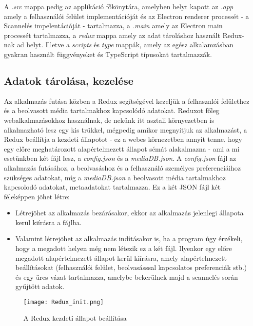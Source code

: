 A {\it .src} mappa pedig az applikáció főkönytára, amelyben helyt kapott az {\it .app} amely a felhasználói felület implementációját és az Electron renderer processét - a Scannelés impelentációját -  tartalmazza, a {\it .main} amely az Electron main processét tartalmazza, a {\it redux} mappa amely az adat tároláshoz használt Redux-nak ad helyt. Illetve a {\it scripts} és {\it type} mappák, amely az egész alkalamzásban gyakran használt függvényeket és TypeScript típusokat tartalmazzák.

\subsection{Adatok tárolása, kezelése}
Az alkalmazás futása közben a Redux segítségével kezeljük a felhasznlói felülethez és a beolvasott média tartalmakhoz kapcsolódó adatokat. Reduxot főleg webalkalmazásokhoz használnak, de nekünk itt asztali környezetben is alkalmazható lesz egy kis trükkel, mégpedig amikor megnyitjuk az alkalmazást, a Redux beállítja a kezdeti állapotot - ez a webes körnezetben annyit tenne, hogy egy előre meghatározott alapértelmezett állapot sémát alakalmazna - ami a mi esetünkben két fájl lesz, a {\it config.json} és a {\it mediaDB.json}. A {\it config.json} fájl az alkalmazás futásához, a beolvasáshoz és a felhasználó személyes preferenciáihoz szükséges adatokat, míg a {\it mediaDB.json} a beolvasott média tartalmakhoz kapcsolodó adatokat, metaadatokat tartalmazza. Ez a két JSON fájl két féleképpen jöhet létre:
\begin{itemize}
    \item Létrejöhet az alkalmazás bezárásakor, ekkor az alkalmazás jelenlegi állapota kerül kiírásra a fájlba.
    \item Valamint létrejöhet az alkalmazás indításakor is, ha a program úgy érzékeli, hogy a megadott helyen még nem létezik ez a két fájl. Ilyenkor egy előre megadott alapértelmezett állapot kerül kiírásra, amely alapértelmezett beállításokat (felhasználói felület, beolvasásssal kapcsolatos preferenciák stb.) és egy üres vázat tartalmazza, amelybe bekerülnek majd a scannelés során gyűjtött adatok.
\end{itemize}

\begin{figure}[H]
	\centering
	\texttt{[image: Redux\_init.png]}
	\caption{A Redux kezdeti állapot beállítása}
	\label{fig:redux-init}
\end{figure}

